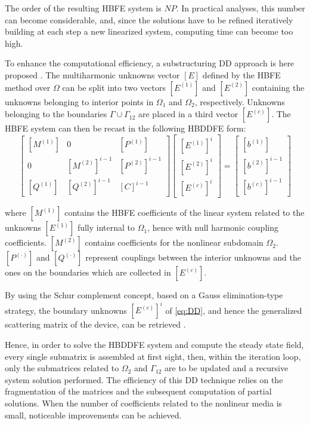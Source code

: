 \documentclass[journal]{IEEEtran}
\begin{document}
The order of the resulting HBFE system is $N P$. In practical analyses, this
number can become considerable, and, since the
solutions have to be refined iteratively building at each step a new linearized
system, computing time can become too high. 

To enhance the computational efficiency, a substructuring DD
approach is here proposed \cite{Saad2000, Toselli2005, Guarnieri2009,
Guarnieri2010}. The multiharmonic unknowns vector $[E]$ defined by the HBFE method
over $\Omega$ can be split into two vectors $[E^{(1)}]$ and $[E^{(2)}]$
containing the unknowns belonging to interior points in $\Omega_1$ and
$\Omega_2$, respectively. Unknowns belonging to the boundaries
$\Gamma\cup\Gamma_{12}$ are placed in a third vector $[E^(c)]$. The HBFE system
can then be recast in the following HBDDFE form:
%
\begin{equation}\label{eq:DD}
\begin{bmatrix}
 [M^{(1)}] &  0  &  [P^{(1)}] \\
 0  &  [M^{(2)}]^{i-1} & [P^{(2)}]^{i-1} \\
 [Q^{(1)}] & [Q^{(2)}]^{i-1} & [C]^{i-1}
\end{bmatrix}
\!\!
\begin{bmatrix}
{[E^{(1)}]^{i}} \\
{[E^{(2)}]^{i}} \\
{[E^{(c)}]^{i}}
\end{bmatrix} 
\!\!=\!\!
\begin{bmatrix}
{[b^{(1)}]} \\
{[b^{(2)}]}^{i-1} \\
{[b^{(c)}]}^{i-1}
\end{bmatrix} 
\end{equation}

\noindent where $[M^{(1)}]$ contains the HBFE coefficients of the linear system
related to the unknowns $[E^{(1)}]$ fully internal to $\Omega_1$, hence with
null harmonic coupling coefficients. $[M^{(2)}]$ contains coefficients for the
nonlinear subdomain $\Omega_2$. ${[P^{(\cdot)}]}$ and ${[Q^{(\cdot)}]}$
represent couplings between the interior unknowns and the ones on the
boundaries which are collected in $[E^{(c)}]$. 

By using the Schur complement concept, based on a Gauss elimination-type
strategy, the boundary unknowns $[E^{(c)}]^{i}$ of \eqref{eq:DD}, and hence the
generalized scattering matrix of the device, can be retrieved 
\cite{Guarnieri2009, Guarnieri2010}.

Hence, in order to solve the HBDDFE system and compute the steady state field,
every single submatrix is assembled at first sight, then, within the iteration
loop, only the submatrices related to $\Omega_2$ and $\Gamma_{12}$ are to be
updated and a recursive system solution performed. The efficiency of this 
DD technique relies on the fragmentation of the
matrices and the subsequent computation of partial solutions. When the number
of coefficients related to the nonlinear media is small, noticeable
improvements can be achieved.
\end{document}
